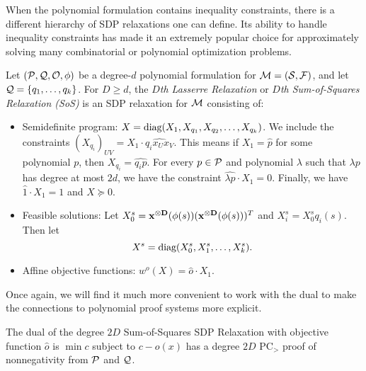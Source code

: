 When the polynomial formulation contains inequality constraints, there is a different hierarchy of SDP relaxations one can define. Its ability to handle inequality constraints has made it an extremely popular choice for approximately solving many combinatorial or polynomial optimization problems.
\begin{definition}
Let $(\mathcal P, \mathcal Q, \mathcal O, \phi)$ be a degree-$d$ polynomial formulation for $\mathcal M = (\mathcal S, \mathcal F)$, and let $\mathcal Q = \{q_1, \dots, q_k\}$. For $D \geq d$, the \emph{$D$th Lasserre Relaxation} or \emph{$D$th Sum-of-Squares Relaxation (SoS)} is an SDP relaxation for $\mathcal M$ consisting of:
\begin{itemize}
\item Semidefinite program: $X = \text{diag}(X_1, X_{q_1}, X_{q_2}, \dots, X_{q_k})$. We include the constraints $(X_{q_i})_{UV} = X_1 \cdot \widehat{q_ix_Ux_V}$. This means if $X_1 = \widehat{p}$ for some polynomial $p$, then $X_{q_i} = \widehat{q_ip}$. For every $p \in \mathcal P$ and polynomial $\lambda$ such that $\lambda p$ has degree at most $2d$, we have the constraint $\widehat{\lambda p} \cdot X_1 = 0$. Finally, we have $\widehat{1} \cdot X_1 = 1$ and $X \succeq 0$.
\item Feasible solutions: Let $X_0^s = \mathbf{x^{\otimes D}}(\phi(s))(\mathbf{x^{\otimes D}}(\phi(s)))^T$ and $X_i^s = X_0^s q_i(s)$. Then let
\[X^s = \text{diag}(X_0^s, X_1^s,\dots,X_k^s).\]
\item Affine objective functions: $w^o(X) = \widehat{o} \cdot X_1$.
\end{itemize}
\end{definition}
Once again, we will find it much more convenient to work with the dual to make the connections to polynomial proof systems more explicit.
\begin{lemma}
The dual of the degree $2D$ Sum-of-Squares SDP Relaxation with objective function $\widehat{o}$ is $\min c$ subject to $c - o(x)$ has a degree $2D$ PC$_>$ proof of nonnegativity from $\mathcal P$ and $\mathcal Q$.
\end{lemma}
